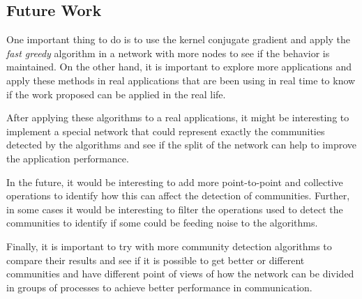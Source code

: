 \documentclass[journal]{IEEEtran}
\begin{document}
\begin{NoHyper}
\section{Future Work}

One important thing to do is to use the kernel conjugate gradient and apply the \textit{fast greedy} algorithm in a network with more nodes to see if the behavior is maintained. On the other hand, it is important to explore more applications and apply these methods in real applications that are been using in real time to know if the work proposed can be applied in the real life. 

After applying these algorithms to a real applications, it might be interesting to implement a special network that could represent exactly the communities detected by the algorithms and see if the split of the network can help to improve the application performance.

In the future, it would be interesting to add more point-to-point and collective operations to identify how this can affect the detection of communities. Further, in some cases it would be interesting to filter the operations used to detect the communities to identify if some could be feeding noise to the algorithms.

Finally, it is important to try with more community detection algorithms to compare their results and see if it is possible to get better or different communities and have different point of views of how the network can be divided in groups of processes to achieve better performance in communication.





\end{NoHyper}
\end{document}
